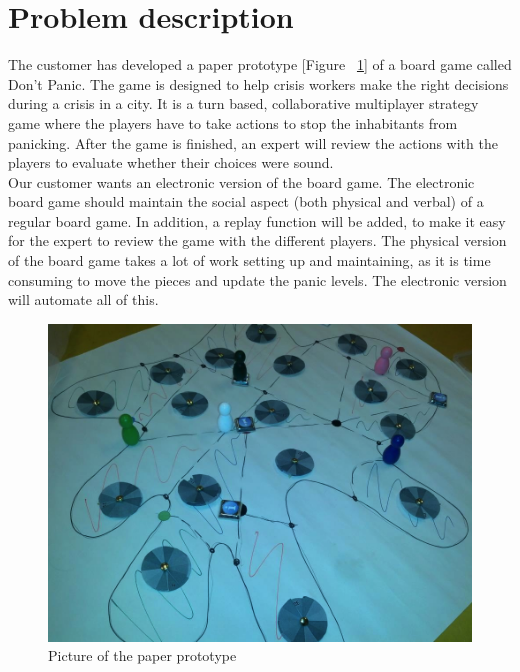 \section{Problem description} 

The customer has developed a paper prototype [Figure ~\ref{fig:paperPrototype}] 
of a board game called Don’t Panic. The game is designed to help crisis workers 
make the right decisions during a crisis in a city. It is a turn based, 
collaborative multiplayer strategy game where the players have to take actions to stop the 
inhabitants from panicking. After the game is finished, an expert will review 
the actions with the players to evaluate whether their choices were sound. 
\\
Our customer wants an electronic version of the board game. The electronic 
board game should maintain the social aspect (both physical and verbal) of a 
regular board game. In addition, a replay function will be added, to make it 
easy for the expert to review the game with the different players. The 
physical version of the board game takes a lot of work setting up and 
maintaining, as it is time consuming to move the pieces and update the panic 
levels. The electronic version will automate all of this.
\\

\begin{figure}[H]
  \centering
    \includegraphics[width=1.0\textwidth]{img/paperprototype}
  \caption{Picture of the paper prototype} 
  \label{fig:paperPrototype}
\end{figure}


